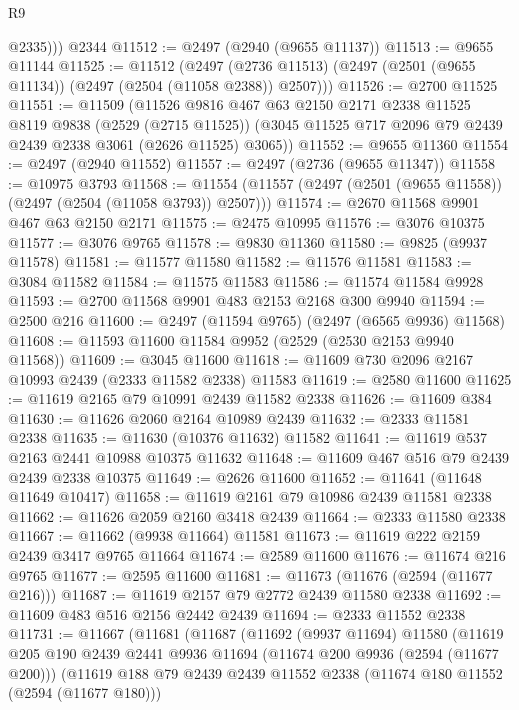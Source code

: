 \begin{lexlean}{R9}
\begin{coremodule}
          @2335)))
    @2344
@11512 := @2497 (@2940 (@9655 @11137))
@11513 := @9655 @11144
@11525 := @11512
    (@2497 (@2736 @11513) (@2497 (@2501 (@9655 @11134)) (@2497 (@2504 (@11058 @2388)) @2507)))
@11526 := @2700 @11525
@11551 := @11509
    (@11526
      @9816
      @467
      @63
      @2150
      @2171
      @2338
      @11525
      @8119
      @9838
      (@2529 (@2715 @11525))
      (@3045 @11525 @717 @2096 @79 @2439 @2439 @2338 @3061 (@2626 @11525) @3065))
@11552 := @9655 @11360
@11554 := @2497 (@2940 @11552)
@11557 := @2497 (@2736 (@9655 @11347))
@11558 := @10975 @3793
@11568 := @11554 (@11557 (@2497 (@2501 (@9655 @11558)) (@2497 (@2504 (@11058 @3793)) @2507)))
@11574 := @2670 @11568 @9901 @467 @63 @2150 @2171
@11575 := @2475 @10995
@11576 := @3076 @10375
@11577 := @3076 @9765
@11578 := @9830 @11360
@11580 := @9825 (@9937 @11578)
@11581 := @11577 @11580
@11582 := @11576 @11581
@11583 := @3084 @11582
@11584 := @11575 @11583
@11586 := @11574 @11584 @9928
@11593 := @2700 @11568 @9901 @483 @2153 @2168 @300 @9940
@11594 := @2500 @216
@11600 := @2497 (@11594 @9765) (@2497 (@6565 @9936) @11568)
@11608 := @11593 @11600 @11584 @9952 (@2529 (@2530 @2153 @9940 @11568))
@11609 := @3045 @11600
@11618 := @11609 @730 @2096 @2167 @10993 @2439 (@2333 @11582 @2338) @11583
@11619 := @2580 @11600
@11625 := @11619 @2165 @79 @10991 @2439 @11582 @2338
@11626 := @11609 @384
@11630 := @11626 @2060 @2164 @10989 @2439
@11632 := @2333 @11581 @2338
@11635 := @11630 (@10376 @11632) @11582
@11641 := @11619 @537 @2163 @2441 @10988 @10375 @11632
@11648 := @11609 @467 @516 @79 @2439 @2439 @2338 @10375
@11649 := @2626 @11600
@11652 := @11641 (@11648 @11649 @10417)
@11658 := @11619 @2161 @79 @10986 @2439 @11581 @2338
@11662 := @11626 @2059 @2160 @3418 @2439
@11664 := @2333 @11580 @2338
@11667 := @11662 (@9938 @11664) @11581
@11673 := @11619 @222 @2159 @2439 @3417 @9765 @11664
@11674 := @2589 @11600
@11676 := @11674 @216 @9765
@11677 := @2595 @11600
@11681 := @11673 (@11676 (@2594 (@11677 @216)))
@11687 := @11619 @2157 @79 @2772 @2439 @11580 @2338
@11692 := @11609 @483 @516 @2156 @2442 @2439
@11694 := @2333 @11552 @2338
@11731 := @11667
    (@11681
      (@11687
        (@11692
          (@9937 @11694)
          @11580
          (@11619
            @205
            @190
            @2439
            @2441
            @9936
            @11694
            (@11674 @200 @9936 (@2594 (@11677 @200)))
            (@11619
              @188
              @79
              @2439
              @2439
              @11552
              @2338
              (@11674 @180 @11552 (@2594 (@11677 @180)))

\end{coremodule}
\end{lexlean}
